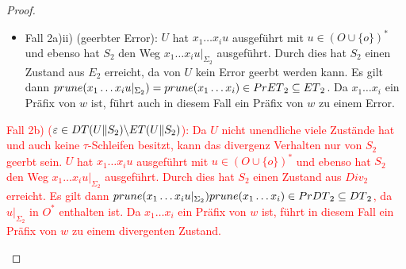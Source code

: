 \begin{proof}
\begin{itemize}
\begin{itemize}
\begin{itemize}
              $q_{02} \overset{x_1\dots x_i}{\Rightarrow} q'
              \overset{x_{i+1}}{\not{\hspace{-0.1cm}\rightarrow}}$ und damit
              gilt $x_1\dots x_{i+1}\in \MIT{}_2\subseteq \ET{}_2$. Somit ist
              ein Präfix von $w$ in $\ET{}_2$ enthalten.
            \item Fall 2a)ii) (geerbter Error): $U$ hat $x_1\dots x_iu$
              ausgeführt mit $u\in (O\cup\{o\})^*$ und ebenso hat $S_2$ den
              Weg $x_1\dots x_iu|_{\Sigma _2}$ ausgeführt. Durch dies hat $S_2$ einen
              Zustand aus $E_2$ erreicht, da von $U$ kein Error geerbt werden
              kann. Es gilt dann $prune{}(x_1\dots x_iu|_{\Sigma _2})=
              prune{}(x_1\dots x_i)\in PrET{}_2\subseteq ET{}_2$. Da
              $x_1\dots x_i$ ein Präfix von $w$ ist, führt auch in diesem Fall
              ein Präfix von $w$ zu einem Error.
          \end{itemize}
        \textcolor{red}{\item Fall 2b) ($\varepsilon\in DT{}(U\|S_2)\backslash ET{}(U\|S_2)$):
          Da $U$ nicht unendliche viele Zustände hat und auch keine
          $\tau$-Schleifen besitzt, kann das divergenz Verhalten nur von $S_2$
          geerbt sein. $U$ hat $x_1\dots x_iu$ ausgeführt mit $u\in (O\cup
          \{o\})^*$ und ebenso hat $S_2$ den Weg $x_1\dots x_iu|_{\Sigma _2}$
          ausgeführt. Durch dies hat $S_2$ einen Zustand aus $Div_2$
          erreicht. Es gilt dann $prune{}(x_1\dots x_iu|_{\Sigma
          _2})prune{}(x_1\dots x_i)\in PrDT{}_2\subseteq DT{}_2$, da
          $u|_{\Sigma _2}$ in $O^*$ enthalten ist. Da $x_1\dots x_i$ ein Präfix
          von $w$ ist, führt in diesem Fall ein Präfix von $w$ zu einem
        divergenten Zustand.\lightning}
      \end{itemize}
  \end{itemize}


\end{proof}
